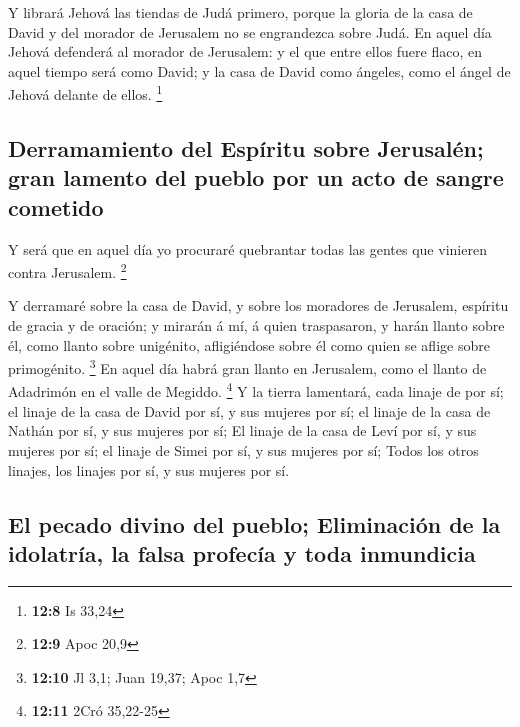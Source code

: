  Y librará Jehová las tiendas de Judá primero, porque la
gloria de la casa de David y del morador de Jerusalem no se engrandezca
sobre Judá.  En aquel día Jehová defenderá al morador de
Jerusalem: y el que entre ellos fuere flaco, en aquel tiempo será como
David; y la casa de David como ángeles, como el ángel de Jehová delante
de ellos. \footnote{\textbf{12:8} Is 33,24}

\hypertarget{derramamiento-del-espuxedritu-sobre-jerusaluxe9n-gran-lamento-del-pueblo-por-un-acto-de-sangre-cometido}{%
\subsection{Derramamiento del Espíritu sobre Jerusalén; gran lamento del
pueblo por un acto de sangre
cometido}\label{derramamiento-del-espuxedritu-sobre-jerusaluxe9n-gran-lamento-del-pueblo-por-un-acto-de-sangre-cometido}}

 Y será que en aquel día yo procuraré quebrantar todas las
gentes que vinieren contra Jerusalem. \footnote{\textbf{12:9} Apoc 20,9}

 Y derramaré sobre la casa de David, y sobre los
moradores de Jerusalem, espíritu de gracia y de oración; y mirarán á mí,
á quien traspasaron, y harán llanto sobre él, como llanto sobre
unigénito, afligiéndose sobre él como quien se aflige sobre primogénito.
\footnote{\textbf{12:10} Jl 3,1; Juan 19,37; Apoc 1,7} 
En aquel día habrá gran llanto en Jerusalem, como el llanto de Adadrimón
en el valle de Megiddo. \footnote{\textbf{12:11} 2Cró 35,22-25}
 Y la tierra lamentará, cada linaje de por sí; el linaje
de la casa de David por sí, y sus mujeres por sí; el linaje de la casa
de Nathán por sí, y sus mujeres por sí;  El linaje de la
casa de Leví por sí, y sus mujeres por sí; el linaje de Simei por sí, y
sus mujeres por sí;  Todos los otros linajes, los linajes
por sí, y sus mujeres por sí.

\hypertarget{el-pecado-divino-del-pueblo-eliminaciuxf3n-de-la-idolatruxeda-la-falsa-profecuxeda-y-toda-inmundicia}{%
\subsection{El pecado divino del pueblo; Eliminación de la idolatría, la
falsa profecía y toda
inmundicia}\label{el-pecado-divino-del-pueblo-eliminaciuxf3n-de-la-idolatruxeda-la-falsa-profecuxeda-y-toda-inmundicia}}

